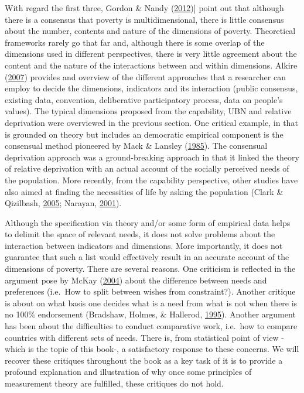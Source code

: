 \documentclass[]{book}
\begin{document}
With regard the first three, Gordon \& Nandy (\protect\hyperlink{ref-Gordon2012}{2012}){]} point out that although there is a consensus that poverty is multidimensional, there is little consensus about the number, contents and nature of the dimensions of poverty. Theoretical frameworks rarely go that far and, although there is some overlap of the dimensions used in different perspectives, there is very little agreement about the content and the nature of the interactions between and within dimensions. Alkire (\protect\hyperlink{ref-Alkire2007}{2007}) provides and overview of the different approaches that a researcher can employ to decide the dimensions, indicators and its interaction (public consensus, existing data, convention, deliberative participatory process, data on people's values). The typical dimensions proposed from the capability, UBN and relative deprivation were overviewed in the previous section. One critical example, in that is grounded on theory but includes an democratic empirical component is the consensual method pioneered by Mack \& Lansley (\protect\hyperlink{ref-Mack1985}{1985}). The consensual deprivation approach was a ground-breaking approach in that it linked the theory of relative deprivation with an actual account of the socially perceived needs of the population. More recently, from the capability perspective, other studies have also aimed at finding the necessities of life by asking the population (Clark \& Qizilbash, \protect\hyperlink{ref-Clark2005}{2005}; Narayan, \protect\hyperlink{ref-Narayan2001}{2001}).

Although the specification via theory and/or some form of empirical data helps to delimit the space of relevant needs, it does not solve problems about the interaction between indicators and dimensions. More importantly, it does not guarantee that such a list would effectively result in an accurate account of the dimensions of poverty. There are several reasons. One criticism is reflected in the argument pose by McKay (\protect\hyperlink{ref-McKay2004}{2004}) about the difference between needs and preferences (i.e.~How to split between wishes from constraint?). Another critique is about on what basis one decides what is a need from what is not when there is no 100\% endorsement (Bradshaw, Holmes, \& Hallerod, \protect\hyperlink{ref-Bradshaw1995}{1995}). Another argument has been about the difficulties to conduct comparative work, i.e.~how to compare countries with different sets of needs. There is, from statistical point of view -which is the topic of this book-, a satisfactory response to these concerns. We will recover these critiques throughout the book as a key task of it is to provide a profound explanation and illustration of why once some principles of measurement theory are fulfilled, these critiques do not hold.
\end{document}
